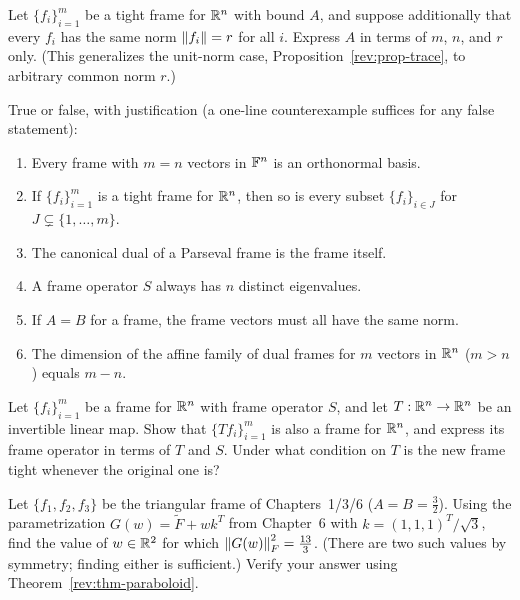 \begin{exercisebox}[title={Problem 3}]
Let $\{f_i\}_{i=1}^m$ be a tight frame for $\mathbb{R}^n$ with bound $A$, and
suppose additionally that every $f_i$ has the same norm $\left\| f_i \right\|=r$
for all $i$. Express $A$ in terms of $m$, $n$, and $r$ only. (This
generalizes the unit-norm case, Proposition~\ref{rev:prop-trace}, to
arbitrary common norm $r$.)
\end{exercisebox}

\begin{exercisebox}[title={Problem 4}]
True or false, with justification (a one-line counterexample suffices
for any false statement):
\begin{enumerate}[label=(\alph*)]
  \item Every frame with $m=n$ vectors in $\mathbb{F}^n$ is an orthonormal
        basis.
  \item If $\{f_i\}_{i=1}^m$ is a tight frame for $\mathbb{R}^n$, then so is
        every subset $\{f_i\}_{i\in J}$ for $J\subsetneq\{1,\ldots,m\}$.
  \item The canonical dual of a Parseval frame is the frame itself.
  \item A frame operator $S$ always has $n$ distinct eigenvalues.
  \item If $A=B$ for a frame, the frame vectors must all have the same
        norm.
  \item The dimension of the affine family of dual frames for $m$
        vectors in $\mathbb{R}^n$ ($m>n$) equals $m-n$.
\end{enumerate}
\end{exercisebox}

\begin{exercisebox}[title={Problem 5}]
Let $\{f_i\}_{i=1}^m$ be a frame for $\mathbb{R}^n$ with frame operator $S$,
and let $T:\mathbb{R}^n\to\mathbb{R}^n$ be an invertible linear map. Show that
$\{Tf_i\}_{i=1}^m$ is also a frame for $\mathbb{R}^n$, and express its frame
operator in terms of $T$ and $S$. Under what condition on $T$ is the
new frame tight whenever the original one is?
\end{exercisebox}

\begin{exercisebox}[title={Problem 6}]
Let $\{f_1,f_2,f_3\}$ be the triangular frame of Chapters~1/3/6
($A=B=\tfrac32$). Using the parametrization $G(w)=\tilde F+wk^T$ from
Chapter~6 with $k=(1,1,1)^T/\sqrt3$, find the value of $w\in\mathbb{R}^2$ for
which $\left\| G(w) \right\|_F^2=\tfrac{13}{3}$. (There are two such values by
symmetry; finding either is sufficient.) Verify your answer using
Theorem~\ref{rev:thm-paraboloid}.
\end{exercisebox}


